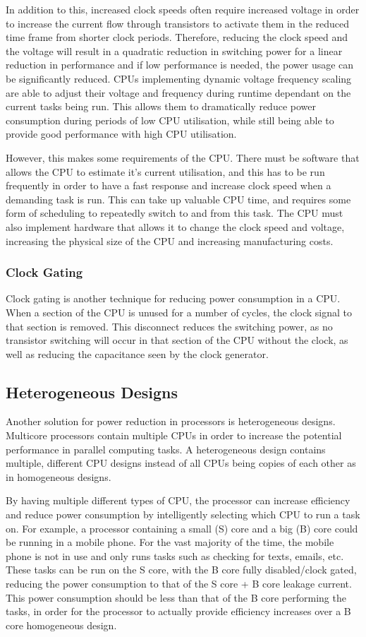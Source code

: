 In addition to this, increased clock speeds often require increased voltage in order to increase the current flow through transistors to activate them in the reduced time frame from shorter clock periods. Therefore, reducing the clock speed and the voltage will result in a quadratic reduction in switching power for a linear reduction in performance and if low performance is needed, the power usage can be significantly reduced. CPUs implementing dynamic voltage frequency scaling are able to adjust their voltage and frequency during runtime dependant on the current tasks being run. This allows them to dramatically reduce power consumption during periods of low CPU utilisation, while still being able to provide good performance with high CPU utilisation.

However, this makes some requirements of the CPU. There must be software that allows the CPU to estimate it's current utilisation, and this has to be run frequently in order to have a fast response and increase clock speed when a demanding task is run. This can take up valuable CPU time, and requires some form of scheduling to repeatedly switch to and from this task. The CPU must also implement hardware that allows it to change the clock speed and voltage, increasing the physical size of the CPU and increasing manufacturing costs.

\subsubsection{Clock Gating}
Clock gating is another technique for reducing power consumption in a CPU. When a section of the CPU is unused for a number of cycles, the clock signal to that section is removed. This disconnect reduces the switching power, as no transistor switching will occur in that section of the CPU without the clock, as well as reducing the capacitance seen by the clock generator.

\subsection{Heterogeneous Designs}
Another solution for power reduction in processors is heterogeneous designs. Multicore processors contain multiple CPUs in order to increase the potential performance in parallel computing tasks. A heterogeneous design contains multiple, different CPU designs instead of all CPUs being copies of each other as in homogeneous designs.

By having multiple different types of CPU, the processor can increase efficiency and reduce power consumption by intelligently selecting which CPU to run a task on. For example, a processor containing a small (S) core and a big (B) core could be running in a mobile phone. For the vast majority of the time, the mobile phone is not in use and only runs tasks such as checking for texts, emails, etc. These tasks can be run on the S core, with the B core fully disabled/clock gated, reducing the power consumption to that of the S core + B core leakage current. This power consumption should be less than that of the B core performing the tasks, in order for the processor to actually provide efficiency increases over a B core homogeneous design.

